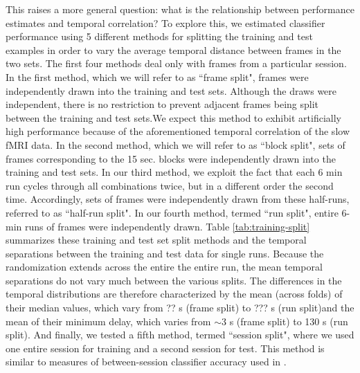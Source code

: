 \documentclass[authoryear]{elsarticle}
\begin{document}
This raises a more general question: what is the relationship between performance estimates and temporal correlation?
To explore this, we estimated classifier performance using 5 different methods for splitting the training and test examples in order to vary the average temporal distance between frames in the two sets. 
The first four methods deal only with frames from a particular session.
In the first method, which we will refer to as  ``frame split", frames were independently drawn into the training and test sets. 
Although the draws were independent, there is no restriction to prevent adjacent frames being split between the training and test sets.We expect this method to exhibit artificially high performance because of the aforementioned temporal correlation of the slow fMRI data.
In the second method, which we will refer to as ``block split", sets of frames corresponding to the 15 sec. blocks were independently drawn into the training and test sets.
In our third method, we exploit the fact that each 6 min run cycles through all combinations twice, but in a different order the second time.
Accordingly, sets of frames were independently drawn from these half-runs, referred to as ``half-run split". 
In our fourth method, termed ``run split", entire 6-min runs of frames were independently drawn. 
Table \ref{tab:training-split} summarizes these training and test set split methods and the temporal separations between the training and test data for single runs. Because the randomization extends across the entire the entire run, the mean temporal separations do not vary much between the various splits. The differences in the temporal distributions are therefore characterized by the mean (across folds) of their median values, which vary from ?? s (frame split) to ??? s (run split)and the mean of their minimum delay, which varies from $\sim$3 s (frame split) to 130 s (run split).
And finally, we tested a fifth method, termed ``session split", where we used one entire session for training and a second session for test.
This method is similar to measures of between-session classifier accuracy used in \citep{Haynes2005}.

\end{document}
